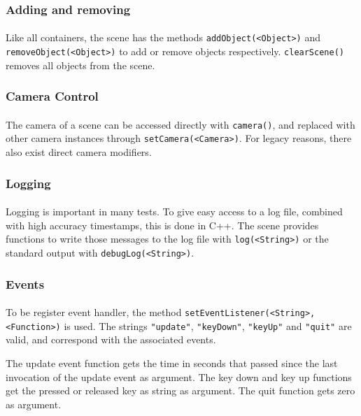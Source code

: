 \subsubsection{Adding and removing}
\paragraph{}
Like all containers, the scene has the methods \texttt{addObject(<Object>)} and \texttt{removeObject(<Object>)} to add or remove objects respectively.
\texttt{clearScene()} removes all objects from the scene.

\subsubsection{Camera Control}
\paragraph{}
The camera of a scene can be accessed directly with \texttt{camera()}, and replaced with other camera instances through \texttt{setCamera(<Camera>)}.
For legacy reasons, there also exist direct camera modifiers.

\subsubsection{Logging}
\paragraph{}
Logging is important in many tests. To give easy access to a log file, combined with high accuracy timestamps, this is done in C++.
The scene provides functions to write those messages to the log file with \texttt{log(<String>)} or the standard output with \texttt{debugLog(<String>)}.

\subsubsection{Events}
\paragraph{}
To be register event handler, the method \texttt{setEventListener(<String>, <Function>)} is used.
The strings \texttt{"update"}, \texttt{"keyDown"}, \texttt{"keyUp"} and \texttt{"quit"} are valid, and correspond with the associated events.

The update event function gets the time in seconds that passed since the last invocation of the update event as argument.
The key down and key up functions get the pressed or released key as string as argument.
The quit function gets zero as argument.

